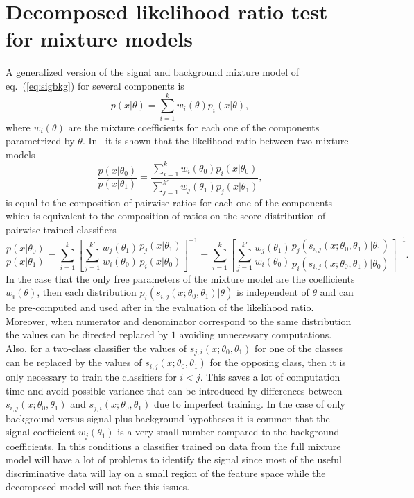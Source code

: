 \documentclass[a4paper]{jpconf}
\begin{document}
\section{Decomposed likelihood ratio test for mixture models}\label{S:DLR}
A generalized version of the signal and background mixture  model of eq.~(\ref{eq:sigbkg}) for several components is 
\begin{equation}
p(x|\theta)=\sum_{i=1}^k w_i(\theta) p_i(x|\theta),  
\end{equation}
where $w_i(\theta)$ are the mixture coefficients for each one of the components parametrized by $\theta$. In~\cite{Cranmer2015} it is shown that the likelihood ratio between two mixture models
\begin{equation}
\frac{p(x|\theta_0)}{p(x|\theta_1)}= \frac{ \sum_{i=1}^k  w_i(\theta_0) p_i(x|\theta_0)}{\sum_{j=1}^{k'} w_{j}(\theta_1) p_{j}(x| \theta_1)}, 
\end{equation}
is equal to the composition of pairwise ratios for each one of the components which is equivalent to the composition of ratios on the score distribution of pairwise trained classifiers
\begin{equation}\label{eq:decomp}
\frac{p(x|\theta_0)}{p(x|\theta_1)} = \sum_{i=1}^k \left[ \sum_{j=1}^{k'} \frac{ w_{j}(\theta_1)}{w_i(\theta_0)} \frac{ p_{j}(x|\theta_1)}{  p_i(x| \theta_0)}  \right]^{-1} = \sum_{i=1}^k \left[ \sum_{j=1}^{k'} \frac{ w_{j}(\theta_1)}{w_i(\theta_0)} \frac{ p_{j}(s_{i,j}(x;\theta_0, \theta_1)|\theta_1)}{  p_i(s_{i,j}(x;\theta_0, \theta_1)| \theta_0)}  \right]^{-1}.
\end{equation}
In the case that the only free parameters of the mixture model are the coefficients $w_i(\theta)$, then each distribution $p_i(s_{i,j}(x;\theta_0, \theta_1)|\theta)$ is independent of $\theta$ and can be pre-computed and used after in the evaluation of the likelihood ratio. Moreover, when numerator and denominator correspond to the same distribution the values can be directed replaced by $1$ avoiding unnecessary computations. Also, for a two-class classifier the values of $s_{j,i}(x;\theta_0,\theta_1)$ for one of the classes can be replaced by the values of $s_{i,j}(x;\theta_0,\theta_1)$ for the opposing class, then it is only necessary to train the classifiers for $i < j$. This saves a lot of computation time and avoid possible variance that can be introduced by differences between $s_{i,j}(x;\theta_0, \theta_1)$ and $s_{j,i}(x;\theta_0, \theta_1)$ due to imperfect training.
In the case of only background versus signal plus background hypotheses it is common that the signal coefficient $w_{j}(\theta_1)$ is a very small number compared to the background coefficients. In this conditions a classifier trained on data from the full mixture model will have a lot of problems to identify the signal since most of the useful discriminative data will lay on a small region of the feature space while the decomposed model will not face this issues.
\end{document}
